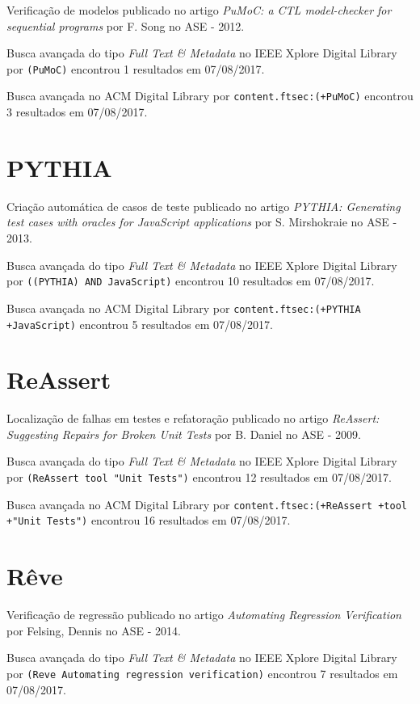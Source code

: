 Verificação de modelos
publicado no artigo
{\it PuMoC: a CTL model-checker for sequential programs}
por
F. Song
no
ASE
-
2012.

Busca avançada do tipo {\it Full Text \& Metadata} no IEEE Xplore Digital Library por
\texttt{(PuMoC)}
encontrou
1 resultados em
07/08/2017.

Busca avançada no ACM Digital Library por
\texttt{content.ftsec:(+PuMoC)}
encontrou
3 resultados em
07/08/2017.

\section{PYTHIA}

Criação automática de casos de teste
publicado no artigo
{\it PYTHIA: Generating test cases with oracles for JavaScript applications}
por
S. Mirshokraie
no
ASE
-
2013.

Busca avançada do tipo {\it Full Text \& Metadata} no IEEE Xplore Digital Library por
\texttt{((PYTHIA) AND JavaScript)}
encontrou
10 resultados em
07/08/2017.

Busca avançada no ACM Digital Library por
\texttt{content.ftsec:(+PYTHIA +JavaScript)}
encontrou
5 resultados em
07/08/2017.

\section{ReAssert}

Localização de falhas em testes e refatoração
publicado no artigo
{\it ReAssert: Suggesting Repairs for Broken Unit Tests}
por
B. Daniel
no
ASE
-
2009.

Busca avançada do tipo {\it Full Text \& Metadata} no IEEE Xplore Digital Library por
\texttt{(ReAssert tool "Unit Tests")}
encontrou
12 resultados em
07/08/2017.

Busca avançada no ACM Digital Library por
\texttt{content.ftsec:(+ReAssert +tool +"Unit Tests")}
encontrou
16 resultados em
07/08/2017.

\section{Rêve}

Verificação de regressão
publicado no artigo
{\it Automating Regression Verification}
por
Felsing, Dennis
no
ASE
-
2014.

Busca avançada do tipo {\it Full Text \& Metadata} no IEEE Xplore Digital Library por
\texttt{(Reve Automating regression verification)}
encontrou
7 resultados em
07/08/2017.

